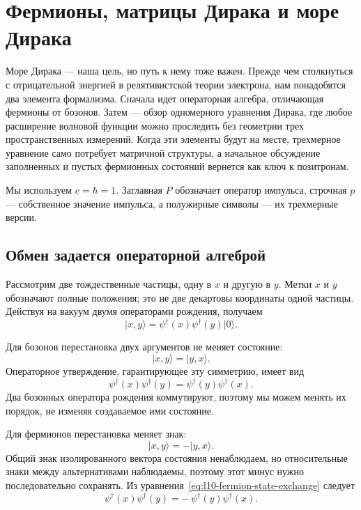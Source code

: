 \chapter{Фермионы, матрицы Дирака и море Дирака}

Море Дирака — наша цель, но путь к нему тоже важен. Прежде чем столкнуться с отрицательной энергией в релятивистской теории электрона, нам понадобятся два элемента формализма. Сначала идет операторная алгебра, отличающая фермионы от бозонов. Затем — обзор одномерного уравнения Дирака, где любое расширение волновой функции можно проследить без геометрии трех пространственных измерений. Когда эти элементы будут на месте, трехмерное уравнение само потребует матричной структуры, а начальное обсуждение заполненных и пустых фермионных состояний вернется как ключ к позитронам.

Мы используем \(c=\hbar=1\). Заглавная \(P\) обозначает оператор импульса, строчная \(p\) — собственное значение импульса, а полужирные символы — их трехмерные версии.

\section{Обмен задается операторной алгеброй}

Рассмотрим две тождественные частицы, одну в \(x\) и другую в \(y\). Метки \(x\) и \(y\) обозначают полные положения; это не две декартовы координаты одной частицы. Действуя на вакуум двумя операторами рождения, получаем
\begin{equation}
\lvert x,y\rangle
=
\psi^\dagger(x)\psi^\dagger(y)\lvert0\rangle.
\label{eq:l10-two-particle-state}
\end{equation}

Для бозонов перестановка двух аргументов не меняет состояние:
\begin{equation}
\lvert x,y\rangle=\lvert y,x\rangle.
\end{equation}
Операторное утверждение, гарантирующее эту симметрию, имеет вид
\begin{equation}
\psi^\dagger(x)\psi^\dagger(y)
=
\psi^\dagger(y)\psi^\dagger(x).
\label{eq:l10-boson-exchange}
\end{equation}
Два бозонных оператора рождения коммутируют, поэтому мы можем менять их порядок, не изменяя создаваемое ими состояние.

Для фермионов перестановка меняет знак:
\begin{equation}
\lvert x,y\rangle=-\lvert y,x\rangle.
\label{eq:l10-fermion-state-exchange}
\end{equation}
Общий знак изолированного вектора состояния ненаблюдаем, но относительные знаки между альтернативами наблюдаемы, поэтому этот минус нужно последовательно сохранять. Из уравнения~\eqref{eq:l10-fermion-state-exchange} следует
\begin{equation}
\psi^\dagger(x)\psi^\dagger(y)
=
-\,\psi^\dagger(y)\psi^\dagger(x).
\label{eq:l10-fermion-operator-exchange}
\end{equation}

